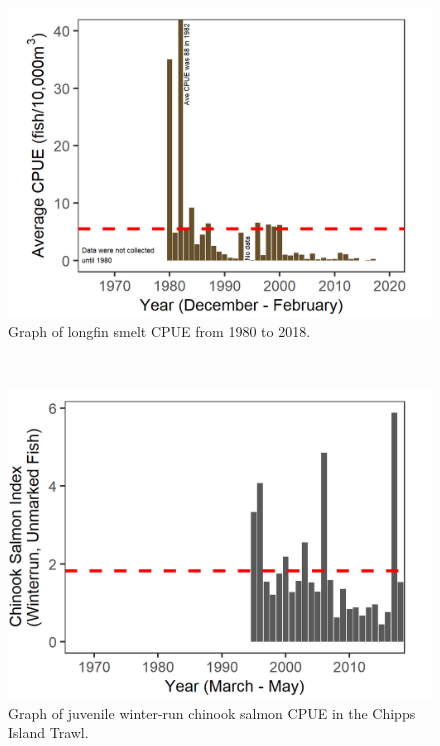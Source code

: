 \documentclass[
]{book}
\begin{document}
\begin{panel-grid}
\begin{columns-nocenter}
\begin{column800}
\begin{expand}
\begin{figure}
\includegraphics[width=15.25in]{figures/lonsme_plot_allYears} \caption{Graph of longfin smelt CPUE from 1980 to 2018. }\label{fig:unnamed-chunk-174}
\end{figure}

\end{expand}

\end{column800}

\begin{column40}

~

\end{column40}

\begin{column800}

\begin{expand}

\begin{figure}
\includegraphics[width=15.25in]{figures/DJFMP_chinook_winterByLength_allyears} \caption{Graph of juvenile winter-run chinook salmon CPUE in the Chipps Island Trawl.}\label{fig:unnamed-chunk-175}
\end{figure}


\end{expand}
\end{column800}
\end{columns-nocenter}
\end{panel-grid}
\end{document}
